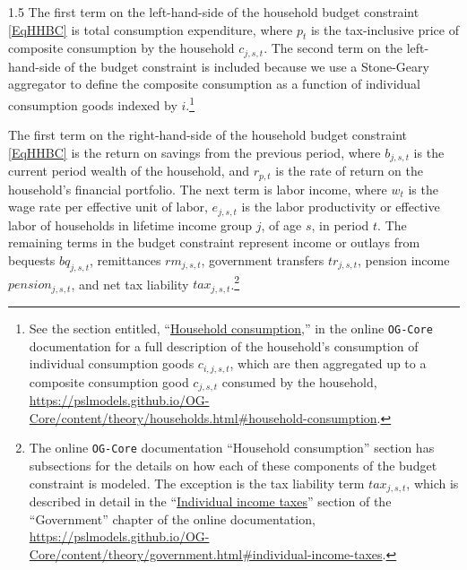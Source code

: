 \documentclass[letterpaper,12pt]{article}
\theoremstyle{definition}
\begin{document}
\begin{spacing}{1.5}
    The first term on the left-hand-side of the household budget constraint \eqref{EqHHBC} is total consumption expenditure, where $p_t$ is the tax-inclusive price of composite consumption by the household $c_{j,s,t}$. The second term on the left-hand-side of the budget constraint is included because we use a Stone-Geary aggregator to define the composite consumption as a function of individual consumption goods indexed by $i$.\footnote{See the section entitled, ``\href{https://pslmodels.github.io/OG-Core/content/theory/households.html\#household-consumption}{Household consumption},'' in the online \texttt{OG-Core} documentation for a full description of the household's consumption of individual consumption goods $c_{i,j,s,t}$, which are then aggregated up to a composite consumption good $c_{j,s,t}$ consumed by the household, \url{https://pslmodels.github.io/OG-Core/content/theory/households.html\#household-consumption}.}

    The first term on the right-hand-side of the household budget constraint \eqref{EqHHBC} is the return on savings from the previous period, where $b_{j,s,t}$ is the current period wealth of the household, and $r_{p,t}$ is the rate of return on the household's financial portfolio. The next term is labor income, where $w_t$ is the wage rate per effective unit of labor, $e_{j,s,t}$ is the labor productivity or effective labor of households in lifetime income group $j$, of age $s$, in period $t$. The remaining terms in the budget constraint represent income or outlays from bequests $bq_{j,s,t}$, remittances $rm_{j,s,t}$, government transfers $tr_{j,s,t}$, pension income $pension_{j,s,t}$, and net tax liability $tax_{j,s,t}$.\footnote{The online \texttt{OG-Core} documentation ``Household consumption'' section has subsections for the details on how each of these components of the budget constraint is modeled. The exception is the tax liability term $tax_{j,s,t}$, which is described in detail in the ``\href{https://pslmodels.github.io/OG-Core/content/theory/government.html\#individual-income-taxes}{Individual income taxes}'' section of the ``Government'' chapter of the online documentation, \href{https://pslmodels.github.io/OG-Core/content/theory/government.html\#individual-income-taxes}{https://pslmodels.github.io/OG-Core/content/theory/government.html\#individual-income-taxes}.}


\end{spacing}
\end{document}
